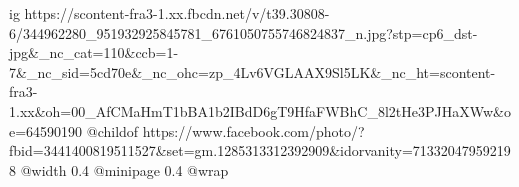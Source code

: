  
 
 
 
 

\ifcmt
  ig https://scontent-fra3-1.xx.fbcdn.net/v/t39.30808-6/344962280_951932925845781_6761050755746824837_n.jpg?stp=cp6_dst-jpg&_nc_cat=110&ccb=1-7&_nc_sid=5cd70e&_nc_ohc=zp_4Lv6VGLAAX9Sl5LK&_nc_ht=scontent-fra3-1.xx&oh=00_AfCMaHmT1bBA1b2IBdD6gT9HfaFWBhC_8l2tHe3PJHaXWw&oe=64590190
	@childof https://www.facebook.com/photo/?fbid=3441400819511527&set=gm.1285313312392909&idorvanity=713320479592198
  @width 0.4
  @minipage 0.4
  @wrap \parpic[r]
\fi
